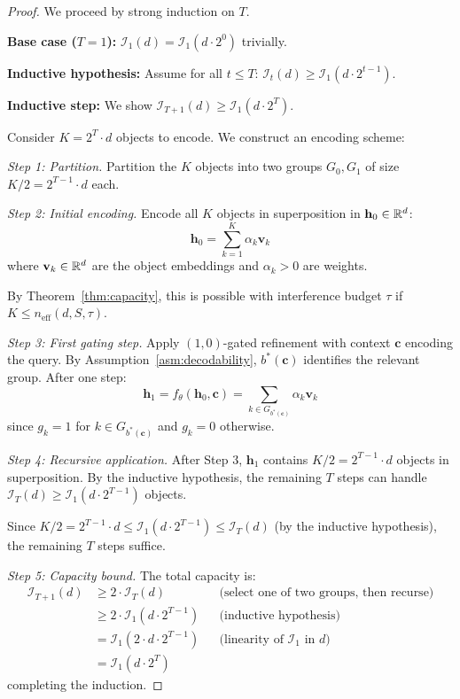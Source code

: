 \begin{proof}
We proceed by strong induction on $T$.

\textbf{Base case ($T = 1$):}
$\mathcal{I}_1(d) = \mathcal{I}_1(d \cdot 2^0)$ trivially.

\textbf{Inductive hypothesis:}
Assume for all $t \leq T$: $\mathcal{I}_t(d) \geq \mathcal{I}_1(d \cdot 2^{t-1})$.

\textbf{Inductive step:}
We show $\mathcal{I}_{T+1}(d) \geq \mathcal{I}_1(d \cdot 2^T)$.

Consider $K = 2^T \cdot d$ objects to encode. We construct an encoding scheme:

\emph{Step 1: Partition.}
Partition the $K$ objects into two groups $G_0, G_1$ of size $K/2 = 2^{T-1} \cdot d$ each.

\emph{Step 2: Initial encoding.}
Encode all $K$ objects in superposition in $\mathbf{h}_0 \in \mathbb{R}^d$:
\begin{equation}
\mathbf{h}_0 = \sum_{k=1}^K \alpha_k \mathbf{v}_k
\end{equation}
where $\mathbf{v}_k \in \mathbb{R}^d$ are the object embeddings and $\alpha_k > 0$ are weights.

By Theorem~\ref{thm:capacity}, this is possible with interference budget $\tau$ if $K \leq n_{\text{eff}}(d, S, \tau)$.

\emph{Step 3: First gating step.}
Apply $(1, 0)$-gated refinement with context $\mathbf{c}$ encoding the query. By Assumption~\ref{asm:decodability}, $b^*(\mathbf{c})$ identifies the relevant group. After one step:
\begin{equation}
\mathbf{h}_1 = f_\theta(\mathbf{h}_0, \mathbf{c}) = \sum_{k \in G_{b^*(\mathbf{c})}} \alpha_k \mathbf{v}_k
\end{equation}
since $g_k = 1$ for $k \in G_{b^*(\mathbf{c})}$ and $g_k = 0$ otherwise.

\emph{Step 4: Recursive application.}
After Step 3, $\mathbf{h}_1$ contains $K/2 = 2^{T-1} \cdot d$ objects in superposition. By the inductive hypothesis, the remaining $T$ steps can handle $\mathcal{I}_T(d) \geq \mathcal{I}_1(d \cdot 2^{T-1})$ objects.

Since $K/2 = 2^{T-1} \cdot d \leq \mathcal{I}_1(d \cdot 2^{T-1}) \leq \mathcal{I}_T(d)$ (by the inductive hypothesis), the remaining $T$ steps suffice.

\emph{Step 5: Capacity bound.}
The total capacity is:
\begin{align}
\mathcal{I}_{T+1}(d) &\geq 2 \cdot \mathcal{I}_T(d) && \text{(select one of two groups, then recurse)} \\
&\geq 2 \cdot \mathcal{I}_1(d \cdot 2^{T-1}) && \text{(inductive hypothesis)} \\
&= \mathcal{I}_1(2 \cdot d \cdot 2^{T-1}) && \text{(linearity of $\mathcal{I}_1$ in $d$)} \\
&= \mathcal{I}_1(d \cdot 2^T)
\end{align}
completing the induction.
\end{proof}

